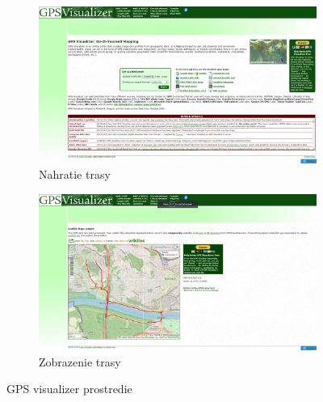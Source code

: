 \begin{figure}[H]
  \centering
  \begin{subfigure}{.7\textwidth}
    \centering
    \includegraphics[width=1\textwidth]{img/gps_visualizer/gpsvisualizer1.png}
    \caption{Nahratie trasy}
  \end{subfigure}
  \begin{subfigure}{.7\textwidth}
    \centering
    \includegraphics[width=1\textwidth]{img/gps_visualizer/gpsvisualizer2.png}
    \caption{Zobrazenie trasy}
  \end{subfigure}
  \caption{GPS visualizer prostredie}
  \label{fig:gps-visualizer}
\end{figure}